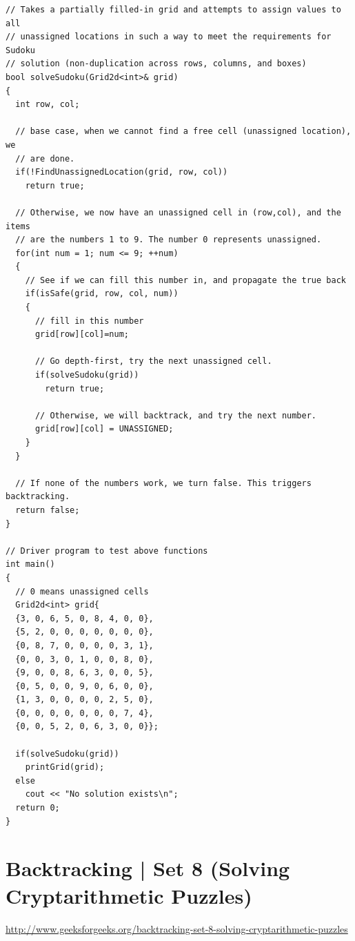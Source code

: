 \begin{lstlisting}[style=raycppnewsnippet]
// Takes a partially filled-in grid and attempts to assign values to all 
// unassigned locations in such a way to meet the requirements for Sudoku
// solution (non-duplication across rows, columns, and boxes)
bool solveSudoku(Grid2d<int>& grid)
{
  int row, col;

  // base case, when we cannot find a free cell (unassigned location), we
  // are done.
  if(!FindUnassignedLocation(grid, row, col))
    return true;

  // Otherwise, we now have an unassigned cell in (row,col), and the items
  // are the numbers 1 to 9. The number 0 represents unassigned.
  for(int num = 1; num <= 9; ++num)
  {
    // See if we can fill this number in, and propagate the true back
    if(isSafe(grid, row, col, num))
    {
      // fill in this number
      grid[row][col]=num;
      
      // Go depth-first, try the next unassigned cell.
      if(solveSudoku(grid))
        return true;

      // Otherwise, we will backtrack, and try the next number.
      grid[row][col] = UNASSIGNED;
    }
  }

  // If none of the numbers work, we turn false. This triggers backtracking.
  return false;
}

// Driver program to test above functions
int main()
{
  // 0 means unassigned cells
  Grid2d<int> grid{
  {3, 0, 6, 5, 0, 8, 4, 0, 0},
  {5, 2, 0, 0, 0, 0, 0, 0, 0},
  {0, 8, 7, 0, 0, 0, 0, 3, 1},
  {0, 0, 3, 0, 1, 0, 0, 8, 0},
  {9, 0, 0, 8, 6, 3, 0, 0, 5},
  {0, 5, 0, 0, 9, 0, 6, 0, 0},
  {1, 3, 0, 0, 0, 0, 2, 5, 0},
  {0, 0, 0, 0, 0, 0, 0, 7, 4},
  {0, 0, 5, 2, 0, 6, 3, 0, 0}};

  if(solveSudoku(grid))
    printGrid(grid);
  else
    cout << "No solution exists\n";
  return 0;
}
\end{lstlisting}


\section{Backtracking | Set 8 (Solving Cryptarithmetic Puzzles)
  \label{secGFGBktrckSet8SolvCryptarithmeticPuzz}}

\url{http://www.geeksforgeeks.org/backtracking-set-8-solving-cryptarithmetic-puzzles}


